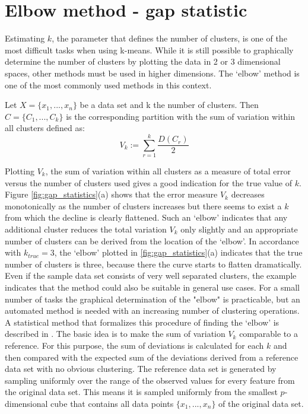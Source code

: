 \clearpage %
\section{Elbow method - gap statistic}
Estimating $k$, the parameter that defines the number of clusters, is one of the most difficult  tasks when using k-means. While it is still possible to graphically determine the number of clusters by plotting the data in 2 or 3 dimensional spaces, other methods must be used in higher dimensions. The `elbow' method is one of the most commonly used methods in this context. 

\begin{definition}
Let $X = \{x_1, ..., x_n\}$ be a data set and k the number of clusters. Then $C=\{C_1, ..., C_k\}$ is the corresponding partition with the sum of variation within all clusters defined as: 
	\begin{equation*}
		V_k := \sum_{r=1}^k \frac{D(C_r)}{2}
	\end{equation*}
\end{definition}

 Plotting $V_k$, the sum of variation within all clusters as a measure of total error versus the number of clusters used gives a good indication for the true value of $k$. Figure \ref{fig:gap_statistics}(a) shows that the error measure $V_k$ decreases monotonically as the number of clusters increases but there seems to exist a $k$ from which the decline is clearly flattened. Such an `elbow' indicates that any additional cluster reduces the total variation $V_k$ only slightly and an appropriate number of clusters can be derived from the location of the `elbow'. In accordance with $k_{true}=3$, the `elbow' plotted in \ref{fig:gap_statistics}(a) indicates that the true number of clusters is three, because there the curve starts to flatten dramatically. Even if the sample data set consists of very well separated clusters, the example indicates that the method could also be suitable in general use cases. For a small number of tasks the graphical determination of the "elbow" is practicable, but an automated method is needed with an increasing number of clustering operations. A statistical method that formalizes this procedure of finding the `elbow' is described in \cite{tibshirani2001estimating}.
 The basic idea is to make the sum of variation $V_k$ comparable to a reference. For this purpose, the sum of deviations is calculated for each $k$ and then compared with the expected sum of the deviations 
 derived from a reference data set with no obvious clustering. The reference data set is generated by sampling uniformly over the range of the observed values for every feature from the original data set.
 This means it is sampled uniformly from the smallest $p$-dimensional cube that contains all data points $\{x_1, ..., x_n\}$ of the original data set.  
 
